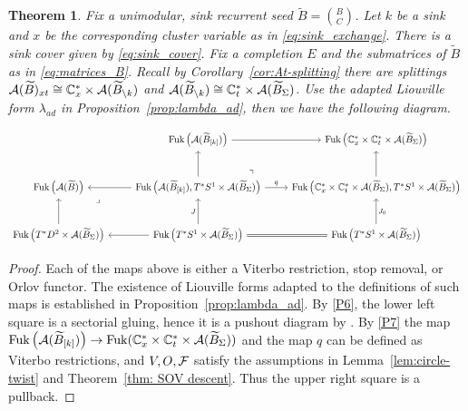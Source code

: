 \documentclass[12pt, letter]{amsart}
\DeclareMathOperator{\Fuk}{Fuk}
\newtheorem{theorem}[dummy]{Theorem}
\theoremstyle{definition}
\begin{document}
\begin{theorem}
       Fix a unimodular, sink recurrent seed \( \widetilde B = \binom{B}{C}\). Let \(k\) be a sink and \(x\) be the corresponding cluster variable as in \eqref{eq:sink_exchange}. 
There is a sink cover given by \eqref{eq:sink_cover}.
Fix a completion \(E\) and the submatrices of $\widetilde{B}$ 
as in \eqref{eq:matrices_B}. Recall by Corollary~\ref{cor:At-splitting} there are splittings \( \mathcal{A}(\widetilde{B})_{xt} \cong  \mathbb{C}^*_x \times \mathcal{A}(\widetilde B_{\setminus k}) \) and \(\mathcal{A}(\widetilde B_{\setminus k}) \cong \mathbb{C}^*_t \times \mathcal{A}(\widetilde B_\Sigma ) \). Use the adapted Liouville form \(\lambda_{ad}\) in Proposition~\ref{prop:lambda_ad}, then we have the following diagram. 

\footnotesize
\begin{equation}\label{eq:s4-A-diagram}
\begin{tikzcd}[%
row sep=large]
&\Fuk\left(\cA( \widetilde B_{[k]})\right)\arrow[r]
&\Fuk\left(  \bC_x^* \times  \bC^*_t \times \cA(\widetilde B_\Sigma )  \right)\\
\Fuk\left( \cA(\widetilde B) \right) \arrow[dr, phantom, "\lrcorner", very near start]
&
\Fuk\left( \cA( \widetilde B_{[k]}), T^*S^1 \times \cA(\widetilde B_\Sigma) \right) \arrow[l]\arrow[u]  
\arrow[ur, phantom, "\urcorner", very near start]
\arrow[r,"q"]
&\Fuk \left(\bC_x^* \times  \bC^*_t \times \cA(\widetilde B_\Sigma ) , T^*S^1 \times \cA(\widetilde B_\Sigma) \right) \arrow[u]\\
\Fuk\left(T^*D^2 \times \cA(\widetilde B_\Sigma)\right) \arrow[u]
&\Fuk\left(T^*S^1 \times \cA(\widetilde B_\Sigma)\right)\arrow[l]
\arrow[u,"J"]\arrow[r,equal]
&\Fuk\left(T^*S^1 \times \cA(\widetilde B_\Sigma)\right)\arrow[u,"J_0"']
\end{tikzcd}
\end{equation}
\normalsize

\end{theorem}

\begin{proof}
    Each of the maps above is either a Viterbo restriction, stop removal, or Orlov functor.  The existence of Liouville forms adapted to the definitions of such maps is established in Proposition~\ref{prop:lambda_ad}.
    By \ref{P6}, the lower left square is a sectorial gluing, hence it is a pushout diagram by \cite{GPS2}. 
    By \ref{P7}
    the map 
    \( \Fuk\left( \cA(\widetilde B_{[k]}) \right) \to \Fuk(\bC_x^* \times  \bC^*_t \times \cA(\widetilde B_\Sigma)) \) and the map \(q\) can be defined as Viterbo restrictions, and
    \( V, O, \mathcal{F}\) satisfy the assumptions in Lemma~\ref{lem:circle-twist} and Theorem~\ref{thm: SOV descent}. Thus
    the upper right square is a pullback. 
\end{proof}
\end{document}
